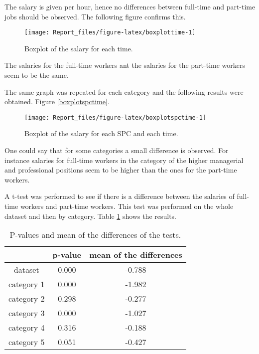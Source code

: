 \documentclass[]{article}
\begin{document}
The salary is given per hour, hence no differences between full-time and
part-time jobs should be observed. The following figure confirms this.

\begin{figure}[H]

\texttt{[image: Report\_files/figure-latex/boxplottime-1]} \hfill{}

\caption{Boxplot of the salary for each time. \label{boxplottime}}\label{fig:boxplottime}
\end{figure}

The salaries for the full-time workers ant the salaries for the
part-time workers seem to be the same.

The same graph was repeated for each category and the following results
were obtained. Figure \ref{boxplotspctime}.

\begin{figure}[H]

\texttt{[image: Report\_files/figure-latex/boxplotspctime-1]} \hfill{}

\caption{Boxplot of the salary for each SPC and each time. \label{boxplotspctime}}\label{fig:boxplotspctime}
\end{figure}

One could say that for some categories a small difference is observed.
For instance salaries for full-time workers in the category of the
higher managerial and professional positions seem to be higher than the
ones for the part-time workers.

A t-test was performed to see if there is a difference between the
salaries of full-time workers and part-time workers. This test was
performed on the whole dataset and then by category. Table
\ref{tabletesttime} shows the results.

\begin{table}[ht]
\centering
\begin{tabular}{ccc}
  \hline
 & p-value & mean of the differences \\ 
  \hline
 dataset & 0.000 & -0.788 \\ 
 category 1 & 0.000 & -1.982 \\ 
 category 2 & 0.298 & -0.277 \\ 
 category 3 & 0.000 & -1.027 \\ 
 category 4 & 0.316 & -0.188 \\ 
 category 5 & 0.051 & -0.427 \\ 
   \hline
\end{tabular}
\caption{P-values and mean of the differences 
             of the tests. \label{tabletesttime}} 
\end{table}
\end{document}

